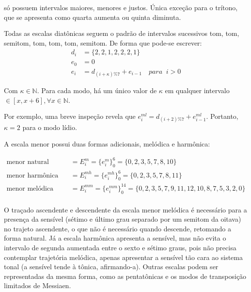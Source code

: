 só possuem intervalos maiores, menores e justos. Única exceção para o trítono, que se apresenta como quarta aumenta ou quinta diminuta.

Todas as escalas diatônicas
seguem o padrão de intervalos sucessivos
tom, tom, semitom, tom, tom, tom, semitom. De forma
que pode-se escrever:
\begin{equation}\label{eq:relacaoDia}
\begin{split}
d_i & =\{2,2,1,2,2,2,1\} \\
e_0 & =0 \\
e_i & =d_{(i+\kappa)\%7}+e_{i-1} \quad para \;\;  i > 0
\end{split}
\end{equation}

Com $\kappa \in \mathbb{N}$. Para cada
modo, há um único valor de $\kappa$ em qualquer intervalo $\in [x,x+6], \forall x \in \mathbb{N}$.

Por exemplo, uma breve
inspeção revela que $e_i^{ml}=d_{(i+2)\%7}+e_{i-1}^{ml}$. Portanto, $\kappa=2$
para o modo lídio. 

A escala menor possui duas formas adicionais, melódica e harmônica:

\begin{equation}\label{eq:escalasMenores}
\begin{split}
\text{menor natural (igual acima)} & = E_i^m = \{e_i^m\}_0^6 = \{0,2,3,5,7,8,10\} \\
\text{menor harmônica} & = E_i^{mh} = \{e_i^{mh}\}_0^6 = \{0,2,3,5,7,8,11\} \\
\text{menor melódica} & = E_i^{mm} = \{e_i^{mm}\}_0^{14} = \{0,2,3,5,7,9,11,12,10,8,7,5,3,2,0\} \\
\end{split}
\end{equation}

O traçado ascendente e descendente da escala menor melódica é necessário para a presença da sensível (sétimo e último grau separado por um semitom da oitava) no trajeto ascendente, o que não é necessário quando descende, retomando a forma natural. Já a escala harmônica apresenta a sensível, mas não evita o intervalo de segunda aumentada entre o sexto e sétimo graus, pois não precisa contemplar trajetória melódica, apenas apresentar a sensível tão cara ao sistema tonal (a sensível tende à tônica, afirmando-a).\cite{Harmonia}
Outras escalas podem ser representadas da mesma forma, como as pentatônicas e os modos de transposição limitados de Messiaen.\cite{Messiaen}

